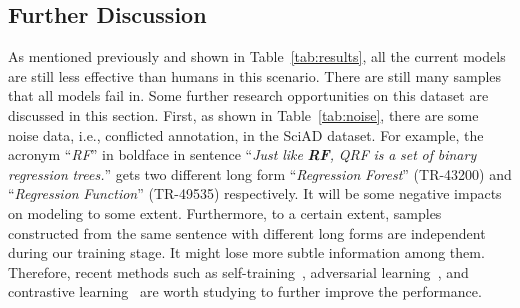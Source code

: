 \subsection{Further Discussion}
As mentioned previously and shown in Table~\ref{tab:results}, all the current models are still less effective than humans in this scenario. There are still many samples that all models fail in. Some further research opportunities on this dataset are discussed in this section. First, as shown in Table~\ref{tab:noise}, there are some noise data, i.e., conflicted annotation, in the SciAD dataset.
For example, the acronym ``\textit{RF}'' in boldface in sentence ``\textit{Just} \textit{like} \textit{\textbf{RF},} \textit{QRF} \textit{is} \textit{a} \textit{set} \textit{of} \textit{binary} \textit{regression} \textit{trees.}'' gets two different long form ``\textit{Regression} \textit{Forest}'' (TR-43200) and ``\textit{Regression} \textit{Function}'' (TR-49535) respectively. 
It will be some negative impacts on modeling to some extent.
Furthermore, to a certain extent, samples constructed from the same sentence with different long forms are independent during our training stage.
It might lose more subtle information among them.
Therefore, recent methods such as self-training~\cite{peng2019trainable,chi2020learning}, adversarial learning~\cite{fgsm,fgm,danqing2020}, and contrastive learning~\cite{hadsell2006dimensionality} are worth studying to further improve the performance.